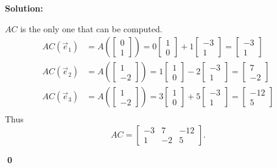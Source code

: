 \documentclass{article}
\newenvironment{solution}
{
  \ignorespaces
  \textbf{Solution:}
}
{
  \ignorespacesafterend
  \begin{flushright}
  {\bfseries \qed}
  \end{flushright}
}
\begin{document}
\begin{solution}
\(AC\) is the only one that can be computed.
\begin{align*}
AC\left( \vec{e}_1 \right) &= A \left( \begin{bmatrix} 0 \\ 1 \end{bmatrix} \right) = 0 \begin{bmatrix} 1 \\ 0 \end{bmatrix} + 1\begin{bmatrix} -3 \\ 1 \end{bmatrix} = \begin{bmatrix} -3 \\ 1 \end{bmatrix} \\
AC\left( \vec{e}_2 \right) &= A \left( \begin{bmatrix} 1 \\ -2 \end{bmatrix} \right) = 1 \begin{bmatrix} 1 \\ 0 \end{bmatrix} -2\begin{bmatrix} -3 \\ 1 \end{bmatrix} = \begin{bmatrix} 7 \\ -2 \end{bmatrix} \\
AC\left( \vec{e}_3 \right) &= A \left( \begin{bmatrix} 1 \\ -2 \end{bmatrix} \right) = 3 \begin{bmatrix} 1 \\ 0 \end{bmatrix} + 5\begin{bmatrix} -3 \\ 1 \end{bmatrix} = \begin{bmatrix} -12 \\ 5 \end{bmatrix} \\
\end{align*}
Thus
$$AC = \begin{bmatrix} -3 & 7 & -12 \\ 1 & -2 & 5 \end{bmatrix}.$$
\end{solution}
\end{document}
